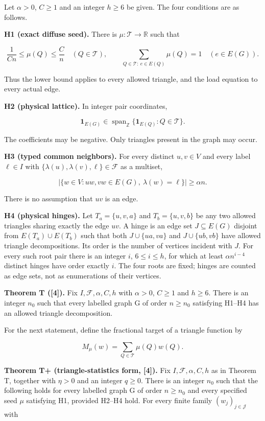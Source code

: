 \documentclass[english,11pt,a4paper]{article}
\begin{document}
Let \(\alpha>0\), \(C\ge1\) and an integer \(h\ge6\) be given. The four conditions are as follows.

\textbf{H1 (exact diffuse seed).} There is \(\mu:\mathcal T\to\mathbb R\) such that

\[\frac1{Cn}\le\mu(Q)\le\frac Cn\quad(Q\in\mathcal T),\qquad
\sum_{Q\in\mathcal T:\ e\in E(Q)}\mu(Q)=1\quad(e\in E(G)).\]

Thus the lower bound applies to every allowed triangle, and the load equation to every actual edge.

\textbf{H2 (physical lattice).} In integer pair coordinates,

\[\mathbf1_{E(G)}\in\operatorname{span}_{\mathbb Z}
\{\mathbf1_{E(Q)}:Q\in\mathcal T\}.\]

The coefficients may be negative. Only triangles present in the graph may occur.

\textbf{H3 (typed common neighbors).} For every distinct \(u,v\in V\) and every label \(\ell\in I\) with \(\{\lambda(u),\lambda(v),\ell\}\in\mathcal F\) as a multiset,

\[|\{w\in V:uw,vw\in E(G),\ \lambda(w)=\ell\}|\ge\alpha n.\]

There is no assumption that \(uv\) is an edge.

\textbf{H4 (physical hinges).} Let \(T_a=\{u,v,a\}\) and \(T_b=\{u,v,b\}\) be any two allowed triangles sharing exactly the edge \(uv\). A hinge is an edge set \(J\subseteq E(G)\) disjoint from \(E(T_a)\cup E(T_b)\) such that both \(J\cup\{ua,va\}\) and \(J\cup\{ub,vb\}\) have allowed triangle decompositions. Its order is the number of vertices incident with \(J\). For every such root pair there is an integer \(i\), \(6\le i\le h\), for which at least \(\alpha n^{i-4}\) distinct hinges have order exactly \(i\). The four roots are fixed; hinges are counted as edge sets, not as enumerations of their vertices.

\textbf{Theorem T ({[}4{]}).} Fix \(I,\mathcal F,\alpha,C,h\) with \(\alpha>0\), \(C\geq1\) and \(h\geq6\). There is an integer \(n_0\) such that every labelled graph G of order \(n\geq n_0\) satisfying H1--H4 has an allowed triangle decomposition.

For the next statement, define the fractional target of a triangle function by

\[M_\mu(w)=\sum_{Q\in\mathcal T}\mu(Q)w(Q).\]

\textbf{Theorem T+ (triangle-statistics form, {[}4{]}).} Fix \(I,\mathcal F,\alpha,C,h\) as in Theorem T, together with \(\eta>0\) and an integer \(q\geq0\). There is an integer \(n_0\) such that the following holds for every labelled graph G of order \(n\geq n_0\) and every specified seed \(\mu\) satisfying H1, provided H2--H4 hold. For every finite family \((w_j)_{j\in\mathcal J}\) with
\end{document}
